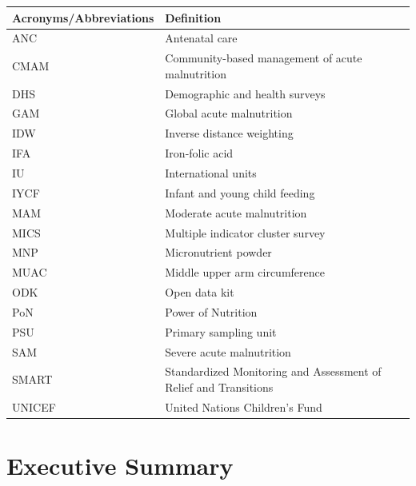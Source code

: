 \documentclass[12pt,a4paper]{article}
\begin{document}
\begin{longtable}{ll}
\toprule
\textbf{Acronyms/Abbreviations} & \textbf{Definition}\\
\midrule
ANC & Antenatal care\\
CMAM & Community-based management of acute malnutrition\\
DHS & Demographic and health surveys\\
GAM & Global acute malnutrition\\
IDW & Inverse distance weighting\\
\addlinespace
IFA & Iron-folic acid\\
IU & International units\\
IYCF & Infant and young child feeding\\
MAM & Moderate acute malnutrition\\
MICS & Multiple indicator cluster survey\\
\addlinespace
MNP & Micronutrient powder\\
MUAC & Middle upper arm circumference\\
ODK & Open data kit\\
PoN & Power of Nutrition\\
PSU & Primary sampling unit\\
\addlinespace
SAM & Severe acute malnutrition\\
SMART & Standardized Monitoring and Assessment of Relief and Transitions\\
UNICEF & United Nations Children's Fund\\
\bottomrule
\end{longtable}

\newpage

\hypertarget{executive-summary}{%
\section*{Executive Summary}\label{executive-summary}}
\end{document}
